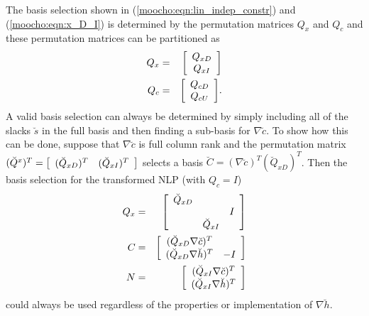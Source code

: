 \documentclass[pdf,ps2pdf,11pt]{SANDreport}
\begin{document}
The basis selection shown in (\ref{moocho:eqn:lin_indep_constr}) and
(\ref{moocho:eqn:x_D_I}) is determined by the permutation matrices $Q_x$ and
$Q_c$ and these permutation matrices can be partitioned as
%
\begin{eqnarray}
Q_{x} & = & {\bmat{c} Q_{xD} \\ Q_{xI} \emat} \label{moocho:eqn:Qx} \\
Q_{c} & = & {\bmat{c} Q_{cD} \\ Q_{cU} \emat} \label{moocho:eqn:Qc}.
\end{eqnarray}
%
A valid basis selection can always be determined by simply including all of
the slacks $\breve{s}$ in the full basis and then finding a sub-basis for
$\nabla \breve{c}$.  To show how this can be done, suppose that $\nabla
\breve{c}$ is full column rank and the permutation matrix $(\breve{Q}^x)^T =
{\bmat{cc} (\breve{Q}_{xD})^T & (\breve{Q}_{xI})^T \emat}$ selects a basis
$\breve{C} = (\nabla \breve{c})^T (\breve{Q}_{xD})^T$.  Then the basis
selection for the transformed NLP (with $Q_c = I$)
%
\begin{eqnarray}
Q_x & = & {\bmat{ccc}
 \breve{Q}_{xD}  &                &     \\
                 &                & I   \\
                 & \breve{Q}_{xI} &
\emat} \\
C & = & {\bmat{cc} ( \breve{Q}_{xD} \nabla \breve{c} )^T \\ ( \breve{Q}_{xD} \nabla \breve{h} )^T & -I \emat}
	\label{moocho:eqn:C_with_slacks} \\
N & = & {\bmat{c} ( \breve{Q}_{xI} \nabla \breve{c} )^T \\ ( \breve{Q}_{xI} \nabla \breve{h} )^T \emat}
\end{eqnarray}
%
could always be used regardless of the properties or implementation of $\nabla
\breve{h}$.
\end{document}
